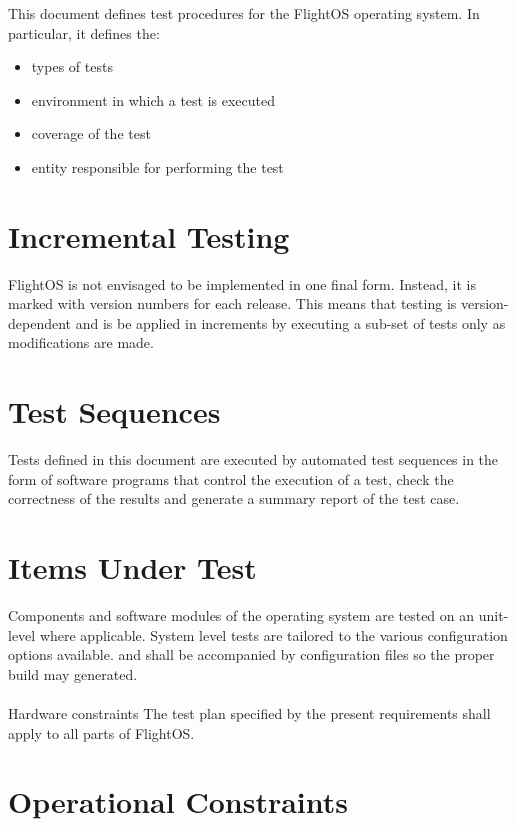 This document defines test procedures for the FlightOS operating system.
In particular, it defines the:
\begin{itemize}
	\item types of tests
	\item environment in which a test is executed
	\item coverage of the test
	\item entity responsible for performing the test
\end{itemize}


\section{Incremental Testing}

FlightOS is not envisaged to be implemented in one final form. Instead, it is
marked with version numbers for each release. This means that testing is
version-dependent and is be applied in increments by executing a sub-set of
tests only as modifications are made.


\section{Test Sequences}

Tests defined in this document are executed by automated test sequences in the
form of software programs that control the execution of a test, check the
correctness of the results and generate a summary report of the test case.



\section{Items Under Test}

Components and software modules of the operating system are tested on an
unit-level where applicable. System level tests are tailored to the
various configuration options available. and shall be accompanied by
configuration files so the proper build may generated.\\
\\

 {Hardware constraints}{%
The test plan specified by the present requirements shall apply to all parts %
of FlightOS.
}{}



\section{Operational Constraints}

